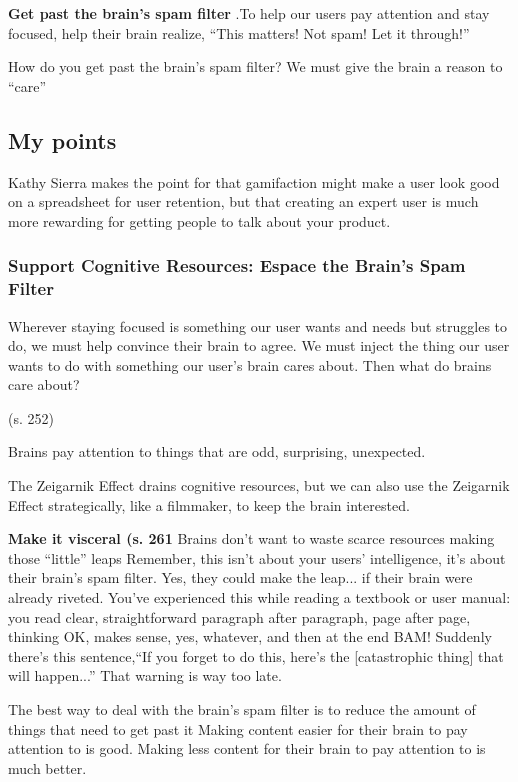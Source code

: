 \textbf{Get past the brain’s spam filter}
.To help our users pay attention and stay focused, help their brain realize, “This matters! Not spam! Let it through!”

How do you get past the brain’s spam filter?
We must give the brain a reason to “care”

\subsection{My points}
Kathy Sierra makes the point for that gamifaction might make a user look good on a spreadsheet for user retention, but that creating an expert user is much more rewarding for getting people to talk about your product.


\subsubsection{Support Cognitive Resources: Espace the Brain's Spam Filter}
Wherever staying focused is something our user wants and needs but struggles to do, we must help convince their brain to agree.
We must inject the thing our user wants to do with something our user’s brain cares about.
Then what do brains care about?

(s. 252)

Brains pay attention to things that are odd, surprising, unexpected.

The Zeigarnik Effect drains cognitive resources, but we can also use the Zeigarnik Effect strategically, like a filmmaker, to keep the brain interested.

\textbf{Make it visceral (s. 261}
Brains don’t want to waste scarce resources making those “little” leaps
Remember, this isn’t about your users’ intelligence, it’s about their brain’s spam filter. Yes, they could make the leap... if their brain were already riveted.
You’ve experienced this while reading a textbook or user manual: you read clear, straightforward paragraph after paragraph, page after page, thinking OK, makes sense, yes, whatever, and then at the end BAM! Suddenly there’s this sentence,“If you forget to do this, here’s the [catastrophic thing] that will happen...”
That warning is way too late.

The best way to deal with the brain’s spam filter is to reduce the amount of things that need to get past it
Making content easier for their brain to pay attention to is good. Making less content for their brain to pay attention to is much better.


